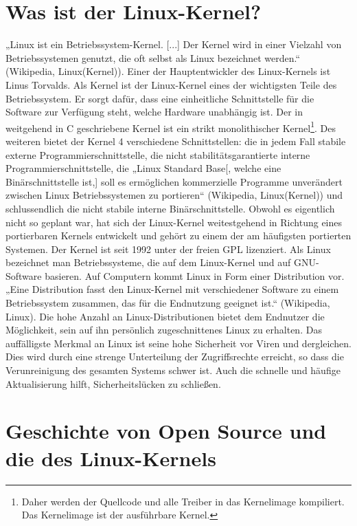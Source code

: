 \documentclass[a4paper,12pt]{article}
\begin{document}
\section{Was ist der Linux-Kernel?}%
„Linux ist ein Betriebssystem-Kernel. [...] Der Kernel wird in einer Vielzahl von Betriebssystemen genutzt, die oft selbst als Linux bezeichnet werden.“ (Wikipedia, Linux(Kernel)). Einer der Hauptentwickler des Linux-Kernels ist Linus Torvalds. Als Kernel ist der Linux-Kernel eines der wichtigsten Teile des Betriebssystem. Er sorgt dafür, dass eine einheitliche Schnittstelle für die Software zur Verfügung steht, welche Hardware unabhängig ist. Der in weitgehend in C geschriebene Kernel ist ein strikt monolithischer Kernel\footnote{Daher werden der Quellcode und alle Treiber in das Kernelimage kompiliert. Das Kernelimage ist der ausführbare Kernel.}. Des weiteren bietet der Kernel 4 verschiedene Schnittstellen: die in jedem Fall stabile externe Programmierschnittstelle, die nicht stabilitätsgarantierte interne Programmierschnittstelle, die „Linux Standard Base[, welche eine Binärschnittstelle ist,] soll es ermöglichen kommerzielle Programme unverändert zwischen Linux Betriebssystemen zu portieren“ (Wikipedia, Linux(Kernel)) und schlussendlich die nicht stabile interne Binärschnittstelle. Obwohl es eigentlich nicht so geplant war, hat sich der Linux-Kernel weitestgehend in Richtung eines portierbaren Kernels entwickelt und gehört zu einem der am häufigsten portierten Systemen. Der Kernel ist seit 1992 unter der freien GPL lizenziert.
Als Linux bezeichnet man Betriebssysteme, die auf dem Linux-Kernel und auf GNU-Software basieren. Auf Computern kommt Linux in Form einer Distribution vor. „Eine Distribution fasst den Linux-Kernel mit verschiedener Software zu einem Betriebssystem zusammen, das für die Endnutzung geeignet ist.“ (Wikipedia, Linux). Die hohe Anzahl an Linux-Distributionen bietet dem Endnutzer die Möglichkeit, sein auf ihn persönlich zugeschnittenes Linux zu erhalten. Das auffälligste Merkmal an Linux ist seine hohe Sicherheit vor Viren und dergleichen. Dies wird durch eine strenge Unterteilung der Zugriffsrechte erreicht, so dass die Verunreinigung des gesamten Systems schwer ist. Auch die schnelle und häufige Aktualisierung hilft, Sicherheitslücken zu schließen.
\newpage
\section{Geschichte von Open Source und die des Linux-Kernels}
\end{document}
